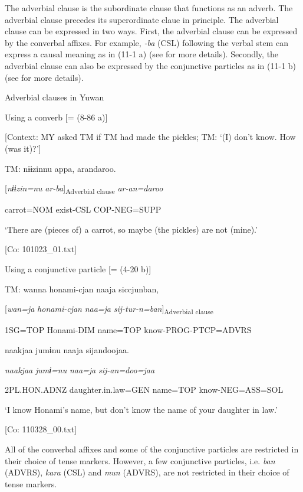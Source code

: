 The adverbial clause is the subordinate clause that functions as an adverb. The adverbial clause precedes its superordinate claue in principle. The adverbial clause can be expressed in two ways. First, the adverbial clause can be expressed by the converbal affixes. For example, \textit{{}-ba} (CSL) following the verbal stem can express a causal meaning as in (11-1 a) (see  for more details). Secondly, the adverbial clause can also be expressed by the conjunctive particles as in (11-1 b) (see  for more details).

\ea\label{ex:11-1}  Adverbial clauses in Yuwan

  \ea Using a converb [= (8-86 a)]

  [Context: MY asked TM if TM had made the pickles; TM: ‘(I) don’t know. How (was it)?’]

  TM:  nɨɨzinnu  appa,  arandaroo.

    [\textit{nɨɨzin=nu}  \textit{ar-ba}]\textsubscript{Adverbial clause}  \textit{ar-an=daroo}

    carrot=NOM  exist-CSL  COP-NEG=SUPP

    ‘There are (pieces of) a carrot, so maybe (the pickles) are not (mine).’

    [Co: 101023\_01.txt]

  \ex Using a conjunctive particle [= (4-20 b)]

  TM:  wanna  honami-{\textbar}cjan{\textbar}  naaja  siccjunban,

    [\textit{wan=ja}  \textit{honami-cjan}  \textit{naa=ja}  \textit{sij-tur-n=ban}]\textsubscript{Adverbial clause}

    1SG=TOP  Honami-DIM  name=TOP  know-PROG-PTCP=ADVRS

    naakjaa  jumɨnu  naaja  sijandoojaa.

    \textit{naakjaa}  \textit{jumɨ=nu}  \textit{naa=ja}  \textit{sij-an=doo=jaa}

    2PL.HON.ADNZ  daughter.in.law=GEN  name=TOP  know-NEG=ASS=SOL

    ‘I know Honami’s name, but don’t know the name of your daughter in law.’

    [Co: 110328\_00.txt]
\z
\z

All of the converbal affixes and some of the conjunctive particles are restricted in their choice of tense markers. However, a few conjunctive particles, i.e. \textit{ban} (ADVRS), \textit{kara} (CSL) and \textit{mun} (ADVRS), are not restricted in their choice of tense markers.

